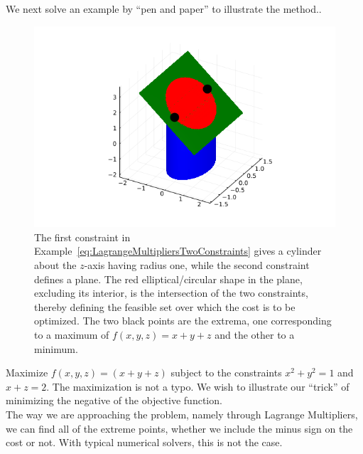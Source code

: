 \bigskip

We next solve an example by ``pen and paper'' to illustrate the method..

\begin{figure}[ht]
    \centering
    \includegraphics[width=0.7\columnwidth]{graphics/Chap06/CylinderPlaneTwoConstraints.png}
    \caption{The first constraint in Example~\ref{eq:LagrangeMultipliersTwoConstraints} gives a cylinder about the $z$-axis having radius one, while the second constraint defines a plane. The red elliptical/circular shape in the plane, excluding its interior, is the intersection of the two constraints, thereby defining the feasible set over which the cost is to be optimized. The two black points are the extrema, one corresponding to a maximum of $f(x, y, z) = x + y + z$ and the other to a minimum.}
    \label{fig:Constrained3LinkManipulator}
\end{figure}


\bigskip


\begin{example} 
\label{eq:LagrangeMultipliersTwoConstraints}
Maximize \( f(x, y, z) = (x + y + z) \) subject to the constraints \( x^2 + y^2 =1 \) and \( x + z = 2 \). The maximization is not a typo. We wish to illustrate our ``trick'' of minimizing the negative of the objective function.\\

The way we are approaching the problem, namely through Lagrange Multipliers, we can find all of the extreme points, whether we include the minus sign on the cost or not. With typical numerical solvers, this is not the case.
\end{example}

